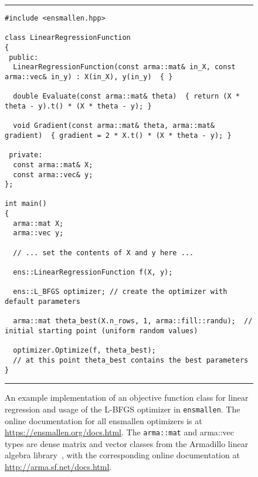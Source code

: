 \begin{figure}[b!]
\hrule
\vspace{1ex}
\centering
\begin{verbatim}
#include <ensmallen.hpp>

class LinearRegressionFunction
{
 public:
  LinearRegressionFunction(const arma::mat& in_X, const arma::vec& in_y) : X(in_X), y(in_y)  { }

  double Evaluate(const arma::mat& theta)  { return (X * theta - y).t() * (X * theta - y); }

  void Gradient(const arma::mat& theta, arma::mat& gradient)  { gradient = 2 * X.t() * (X * theta - y); }

 private:
  const arma::mat& X;
  const arma::vec& y;
};

int main()
{
  arma::mat X;
  arma::vec y;
  
  // ... set the contents of X and y here ...
  
  ens::LinearRegressionFunction f(X, y);

  ens::L_BFGS optimizer; // create the optimizer with default parameters

  arma::mat theta_best(X.n_rows, 1, arma::fill::randu);  // initial starting point (uniform random values)

  optimizer.Optimize(f, theta_best);
  // at this point theta_best contains the best parameters
}
\end{verbatim}
\hrule
\vspace*{-0.5em}
\caption{An example implementation of an objective function class for linear
regression and usage of the L-BFGS optimizer in {\tt ensmallen}.
The online documentation for all ensmallen optimizers
is at \mbox{\url{https://ensmallen.org/docs.html}}.
The {\tt arma::mat} and {arma::vec} types are 
dense matrix and vector classes
from the Armadillo linear algebra library~\cite{sanderson2016armadillo},
with the corresponding online documentation at \mbox{\url{http://arma.sf.net/docs.html}}.
}
\label{fig:lr_function}
\end{figure}

